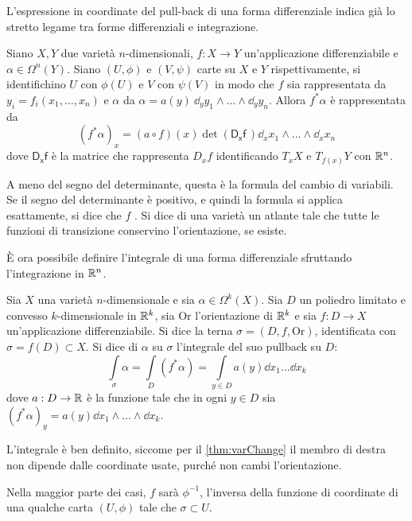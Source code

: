 L'espressione in coordinate del pull-back di una forma differenziale indica già lo stretto legame tra forme differenziali e integrazione.
\begin{theorem} \label{thm:varChange}
  Siano $X,Y$ due varietà $n$-dimensionali, $f:X\to Y$ un'applicazione differenziabile e $\alpha \in  \Omega^n(Y)$. Siano $(U, \phi)$ e $(V,\psi)$ carte su $X$ e $Y$ rispettivamente, si identifichino $U$ con $\phi(U)$ e $V$ con $\psi(V)$ in modo che $f$ sia rappresentata da $y_i = f_i(x_1, \ldots, x_n)$ e $\alpha$ da $\alpha = a(y)\ \dd_y y_1\wedge \ldots \wedge \dd_y y_n$. Allora $f^* \alpha$ è rappresentata da \begin{equation*}
  (f^* \alpha)_x = (a \circ f)(x) \det(\mathsf{D_x f}\,)\dd_x x_1 \wedge \ldots \wedge \dd_x x_n
  \end{equation*}
  dove $\mathsf{D_x f}$ è la matrice che rappresenta $D_x f$ identificando $T_x X$ e $T_{f(x)}Y$ con $\mathbb{R}^{n}$.
\end{theorem}
\begin{remark}
  A meno del segno del determinante, questa è la formula del cambio di variabili. Se il segno del determinante è positivo, e quindi la formula si applica esattamente, si dice che $f$ . Si dice  di una varietà un atlante tale che tutte le funzioni di transizione conservino l'orientazione, se esiste.
\end{remark}

È ora possibile definire l'integrale di una forma differenziale sfruttando l'integrazione in $\mathbb{R}^{n}$.
\begin{definition}
  Sia $X$ una varietà $n$-dimensionale e sia $\alpha \in \Omega^k(X)$. Sia $D$ un poliedro limitato e convesso $k$-dimensionale in $\mathbb{R}^{k}$, sia $\mathrm{Or}$ l'orientazione di $\mathbb{R}^k$ e sia $f:D\to X$ un'applicazione differenziabile. Si dice  la terna $\sigma = (D,f,\mathrm{Or})$, identificata con $\sigma = f(D) \subset X$. Si dice  di $\alpha$ su $\sigma$ l'integrale del suo pullback su $D$: \begin{equation*}
  \int\limits_{\sigma} \alpha = \int\limits_{D} (f^* \alpha) = \int\limits_{y \in D} a(y) \dd{x_1} \ldots \dd{x_k}
  \end{equation*}
  dove $a: D \to \mathbb{R}$ è la funzione tale che in ogni $y \in D$ sia $(f^* \alpha)_y = a(y) \dd{x_1} \wedge \ldots \wedge \dd{x_k}$.
\end{definition}
\begin{remark}
  L'integrale è ben definito, siccome per il \autoref{thm:varChange} il membro di destra non dipende dalle coordinate usate, purché non cambi l'orientazione.
\end{remark}
\begin{remark}
  Nella maggior parte dei casi, $f$ sarà $\phi^{-1}$, l'inversa della funzione di coordinate di una qualche carta $(U,\phi)$ tale che $\sigma \subset U$.
\end{remark}

